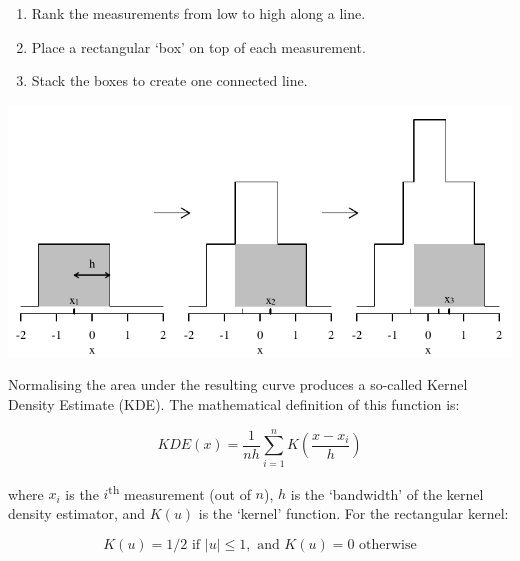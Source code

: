 \begin{enumerate}
\item Rank the measurements from low to high along a line.
\item Place a rectangular `box' on top of each measurement.
\item Stack the boxes to create one connected line.
\end{enumerate}

\noindent\begin{minipage}[t][][b]{.3\textwidth}
  \includegraphics[width=\textwidth]{../figures/rectKDE.pdf}
\end{minipage}
\begin{minipage}[t][][t]{.7\textwidth}
  \label{fig:rectangles}
\end{minipage}

Normalising the area under the resulting curve produces a so-called
Kernel Density Estimate (KDE). The mathematical definition of this
function is:

\begin{equation}
  KDE(x) = \frac{1}{nh} \sum\limits_{i=1}^{n} K\!\left(\frac{x-x_i}{h}\right)
\end{equation}

\noindent where $x_i$ is the $i$\textsuperscript{th} measurement (out
of $n$), $h$ is the `bandwidth' of the kernel density estimator, and
$K(u)$ is the `kernel' function. For the rectangular kernel:

\begin{equation}
  K(u) = 1/2 \mbox{~if~}|u| \leq 1, \mbox{~and~} K(u) = 0 \mbox{~otherwise}
\end{equation}

